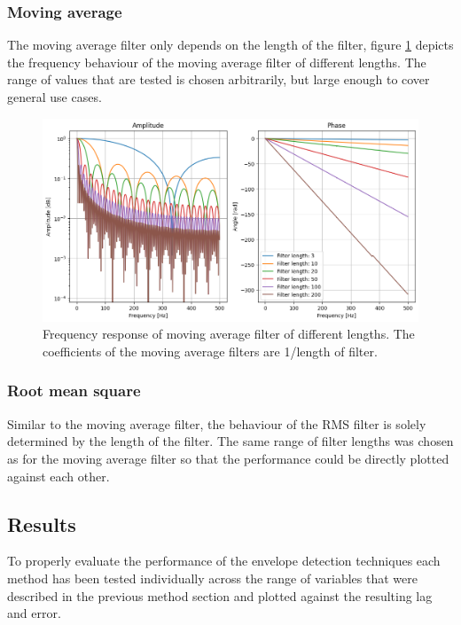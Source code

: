 \subsubsection{Moving average}
The moving average filter only depends on the length of the filter, figure \ref{fig:movingaverage_frequencyresponse_coefficients} depicts the frequency behaviour of the moving average filter of different lengths. The range of values that are tested is chosen arbitrarily, but large enough to cover general use cases.

\begin{figure}[h!t]
	\begin{center}
		\includegraphics[width=1.0\columnwidth]{images/movingaverage_frequencyresponse_coefficients.png}
	\end{center}
	\caption{Frequency response of moving average filter of different lengths. The coefficients of the moving average filters are 1/length of filter.}
	\label{fig:movingaverage_frequencyresponse_coefficients}
\end{figure}

\subsubsection{Root mean square}
Similar to the moving average filter, the behaviour of the RMS filter is solely determined by the length of the filter. The same range of filter lengths was chosen as for the moving average filter so that the performance could be directly plotted against each other.

\subsection{Results}
To properly evaluate the performance of the envelope detection techniques each method has been tested individually across the range of variables that were described in the previous method section and plotted against the resulting lag and error. 

